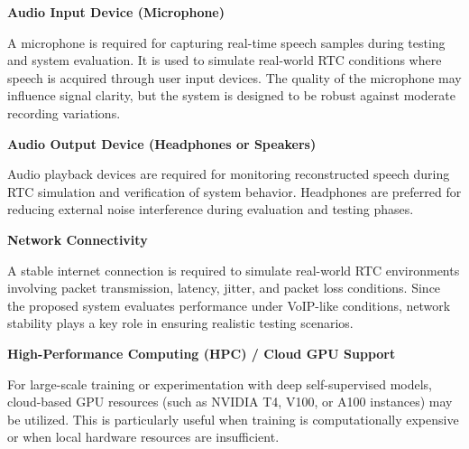 \textbf{Audio Input Device (Microphone)}

A microphone is required for capturing real-time speech samples during testing and system evaluation. It is used to simulate real-world RTC conditions where speech is acquired through user input devices. The quality of the microphone may influence signal clarity, but the system is designed to be robust against moderate recording variations.

\textbf{Audio Output Device (Headphones or Speakers)}

Audio playback devices are required for monitoring reconstructed speech during RTC simulation and verification of system behavior. Headphones are preferred for reducing external noise interference during evaluation and testing phases.

\textbf{Network Connectivity}

A stable internet connection is required to simulate real-world RTC environments involving packet transmission, latency, jitter, and packet loss conditions. Since the proposed system evaluates performance under VoIP-like conditions, network stability plays a key role in ensuring realistic testing scenarios.

\textbf{High-Performance Computing (HPC) / Cloud GPU Support}

For large-scale training or experimentation with deep self-supervised models, cloud-based GPU resources (such as NVIDIA T4, V100, or A100 instances) may be utilized. This is particularly useful when training is computationally expensive or when local hardware resources are insufficient.